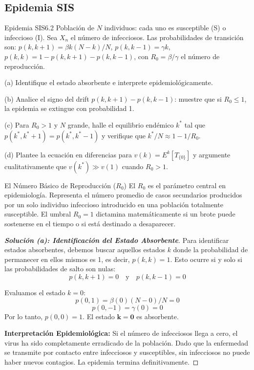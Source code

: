 \documentclass[10pt,a4paper]{article}
\begin{document}
\newpage

\subsection{Epidemia SIS}

\begin{ejercicio}{Epidemia SIS}{6.2}
    Población de $N$ individuos: cada uno es susceptible (S) o infeccioso (I). Sea $X_n$ el número de infecciosos. Las probabilidades de transición son: $p(k, k + 1) = \beta k(N - k)/N$, $p(k, k - 1) = \gamma k$, $p(k, k) = 1 - p(k, k + 1) - p(k, k - 1)$, con $R_0 = \beta/\gamma$ el número de reproducción.
    
    (a) Identifique el estado absorbente e interprete epidemiológicamente.
    
    (b) Analice el signo del drift $p(k, k + 1) - p(k, k - 1)$: muestre que si $R_0 \le 1$, la epidemia se extingue con probabilidad 1.
    
    (c) Para $R_0 > 1$ y $N$ grande, halle el equilibrio endémico $k^*$ tal que $p(k^*, k^* + 1) = p(k^*, k^* - 1)$ y verifique que $k^*/N \approx 1 - 1/R_0$.
    
    (d) Plantee la ecuación en diferencias para $v(k) = E^k[T_{\{0\}}]$ y argumente cualitativamente que $v(k^*) \gg v(1)$ cuando $R_0 > 1$.
\end{ejercicio}

\vspace{2mm}

\begin{nota}{El Número Básico de Reproducción ($R_0$)}
    El $R_0$ es el parámetro central en epidemiología. Representa el número promedio de casos secundarios producidos por un solo individuo infeccioso introducido en una población totalmente susceptible. El umbral $R_0 = 1$ dictamina matemáticamente si un brote puede sostenerse en el tiempo o si está destinado a desaparecer.
\end{nota}

\begin{proof}[\textbf{Solución (a): Identificación del Estado Absorbente}]
    Para identificar estados absorbentes, debemos buscar aquellos estados $k$ donde la probabilidad de permanecer en ellos mismos es 1, es decir, $p(k,k) = 1$. Esto ocurre si y solo si las probabilidades de salto son nulas:
    \[ p(k, k+1) = 0 \quad \text{y} \quad p(k, k-1) = 0 \]
    
    Evaluamos el estado $k = 0$:
    \[ p(0, 1) = \beta (0) (N - 0)/N = 0 \]
    \[ p(0, -1) = \gamma (0) = 0 \]
    Por lo tanto, $p(0,0) = 1$. El estado $\mathbf{k=0}$ es absorbente.
    
    \textbf{Interpretación Epidemiológica:} Si el número de infecciosos llega a cero, el virus ha sido completamente erradicado de la población. Dado que la enfermedad se transmite por contacto entre infecciosos y susceptibles, sin infecciosos no puede haber nuevos contagios. La epidemia termina definitivamente.
\end{proof}
\end{document}
